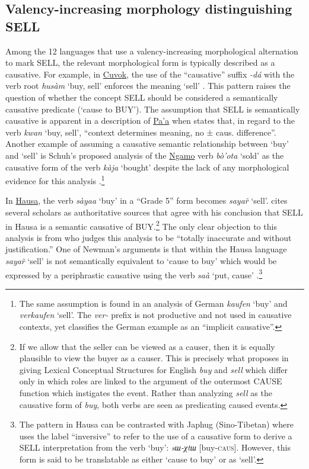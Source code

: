 \subsection{Valency-increasing morphology distinguishing SELL}	
\largerpage
Among the 12 languages that use a valency-increasing morphological alternation to mark SELL, the relevant morphological form is typically described as a causative. For example, in \hyperref[cuvo]{Cuvok}, the use of the ``causative'' suffix \textit{-dá} with the verb root \textit{husàm} `buy, sell' enforces the meaning `sell' \citep[315]{dadakGrammaireCuvokLangue2021}. This pattern raises the question of whether the concept SELL should be considered a semantically causative predicate (`cause to BUY'). The assumption that SELL is semantically causative is apparent in a description of \hyperref[paaa]{Pa'a} when \citet[189]{skinnerAspectsPaanciGrammar1979} states that, in regard to the verb \textit{kwan} `buy, sell', ``context determines meaning, no ± caus. difference''. Another example of assuming a causative semantic relationship between `buy' and `sell' is Schuh's proposed analysis of the \hyperref[ngam]{Ngamo} verb \textit{bò’ota} `sold' as the causative form of the verb \textit{kàja} `bought' despite the lack of any morphological evidence for this analysis \citep[332]{schuhChadicCornucopia2017}.\footnote{The same assumption is found in an analysis of German \textit{kaufen} `buy' and \textit{verkaufen} `sell'. The \textit{ver-} prefix is not productive and not used in causative contexts, yet \citet[270--271]{kastovskyCausatives1973} classifies the German example as an ``implicit causative''.} 

\largerpage
In \hyperref[haus]{Hausa}, the verb \textit{sàyaa} `buy' in a ``Grade 5'' form becomes \textit{sayar̃} `sell'.  \citet{jaggarHausaGrade52014} cites several scholars as authoritative sources that agree with his conclusion that SELL in Hausa is a semantic causative of BUY.\footnote{If we allow that the seller can be viewed as a causer, then it is equally plausible to view the buyer as a causer. This is precisely what \citet[191]{jackendoffSemanticStructures1990} proposes in giving Lexical Conceptual Structures for English \textit{buy} and \textit{sell} which differ only in which roles are linked to the argument of the outermost CAUSE function which instigates the event. Rather than analyzing \textit{sell} as the causative form of \textit{buy}, both verbs are seen as predicating caused events.} The only clear objection to this analysis is from \citet[398]{newmanEfferentialAliasCausative1983} who judges this analysis to be ``totally inaccurate and without justification.'' One of Newman's arguments is that within the Hausa language \textit{sayar̃} `sell' is not semantically equivalent to `cause to buy' which would be expressed by a periphrastic causative using the verb \textit{saà} `put, cause' \citep[402]{newmanEfferentialAliasCausative1983}.\footnote{The pattern in Hausa can be contrasted with Japhug (Sino-Tibetan) where \citet[17]{jacquesGrammarJaphug2021} uses the label ``inversive'' to refer to the use of a causative form to derive a SELL interpretation from the verb `buy': \textit{sɯ-χtɯ} [buy-\textsc{caus}]. However, this form is said to be translatable as either `cause to buy' or as `sell'.}

